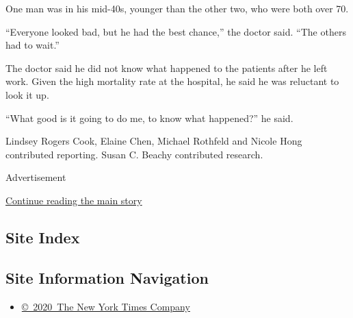 One man was in his mid-40s, younger than the other two, who were both
over 70.

``Everyone looked bad, but he had the best chance,'' the doctor said.
``The others had to wait.''

The doctor said he did not know what happened to the patients after he
left work. Given the high mortality rate at the hospital, he said he was
reluctant to look it up.

``What good is it going to do me, to know what happened?'' he said.

Lindsey Rogers Cook, Elaine Chen, Michael Rothfeld and Nicole Hong
contributed reporting. Susan C. Beachy contributed research.

Advertisement

\protect\hyperlink{after-bottom}{Continue reading the main story}

\hypertarget{site-index}{%
\subsection{Site Index}\label{site-index}}

\hypertarget{site-information-navigation}{%
\subsection{Site Information
Navigation}\label{site-information-navigation}}

\begin{itemize}
\tightlist
\item
  \href{https://help.nytimes3xbfgragh.onion/hc/en-us/articles/115014792127-Copyright-notice}{©~2020~The
  New York Times Company}
\end{itemize}


